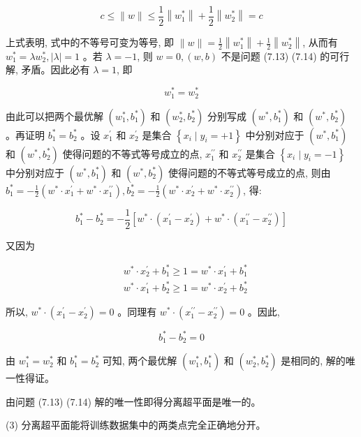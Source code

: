 \documentclass[10pt]{article}
\begin{document}
$$
c \leqslant\|w\| \leqslant \frac{1}{2}\left\|w_{1}^{*}\right\|+\frac{1}{2}\left\|w_{2}^{*}\right\|=c
$$

上式表明, 式中的不等号可变为等号, 即 $\|w\|=\frac{1}{2}\left\|w_{1}^{*}\right\|+\frac{1}{2}\left\|w_{2}^{*}\right\|$, 从而有 $w_{1}^{*}=\lambda w_{2}^{*},|\lambda|=1$ 。若 $\lambda=-1$, 则 $w=0,(w, b)$ 不是问题 (7.13) (7.14) 的可行解, 矛盾。因此必有 $\lambda=1$, 即

$$
w_{1}^{*}=w_{2}^{*}
$$

由此可以把两个最优解 $\left(w_{1}^{*}, b_{1}^{*}\right)$ 和 $\left(w_{2}^{*}, b_{2}^{*}\right)$ 分别写成 $\left(w^{*}, b_{1}^{*}\right)$ 和 $\left(w^{*}, b_{2}^{*}\right)$ 。再证明 $b_{1}^{*}=b_{2}^{*}$ 。设 $x_{1}^{\prime}$ 和 $x_{2}^{\prime}$ 是集合 $\left\{x_{i} \mid y_{i}=+1\right\}$ 中分别对应于 $\left(w^{*}, b_{1}^{*}\right)$ 和 $\left(w^{*}, b_{2}^{*}\right)$ 使得问题的不等式等号成立的点, $x_{1}^{\prime \prime}$ 和 $x_{2}^{\prime \prime}$ 是集合 $\left\{x_{i} \mid y_{i}=-1\right\}$ 中分别对应于 $\left(w^{*}, b_{1}^{*}\right)$ 和 $\left(w^{*}, b_{2}^{*}\right)$ 使得问题的不等式等号成立的点, 则由 $b_{1}^{*}=-\frac{1}{2}\left(w^{*} \cdot x_{1}^{\prime}+w^{*} \cdot x_{1}^{\prime \prime}\right), b_{2}^{*}=-\frac{1}{2}\left(w^{*} \cdot x_{2}^{\prime}+w^{*} \cdot x_{2}^{\prime \prime}\right)$, 得:

$$
b_{1}^{*}-b_{2}^{*}=-\frac{1}{2}\left[w^{*} \cdot\left(x_{1}^{\prime}-x_{2}^{\prime}\right)+w^{*} \cdot\left(x_{1}^{\prime \prime}-x_{2}^{\prime \prime}\right)\right]
$$

又因为

$$
\begin{aligned}
& w^{*} \cdot x_{2}^{\prime}+b_{1}^{*} \geqslant 1=w^{*} \cdot x_{1}^{\prime}+b_{1}^{*} \\
& w^{*} \cdot x_{1}^{\prime}+b_{2}^{*} \geqslant 1=w^{*} \cdot x_{2}^{\prime}+b_{2}^{*}
\end{aligned}
$$

所以, $w^{*} \cdot\left(x_{1}^{\prime}-x_{2}^{\prime}\right)=0$ 。同理有 $w^{*} \cdot\left(x_{1}^{\prime \prime}-x_{2}^{\prime \prime}\right)=0$ 。因此,

$$
b_{1}^{*}-b_{2}^{*}=0
$$

由 $w_{1}^{*}=w_{2}^{*}$ 和 $b_{1}^{*}=b_{2}^{*}$ 可知, 两个最优解 $\left(w_{1}^{*}, b_{1}^{*}\right)$ 和 $\left(w_{2}^{*}, b_{2}^{*}\right)$ 是相同的, 解的唯一性得证。

由问题 (7.13) (7.14) 解的唯一性即得分离超平面是唯一的。

(3) 分离超平面能将训练数据集中的两类点完全正确地分开。
\end{document}

